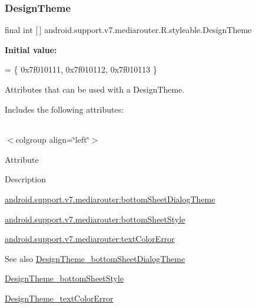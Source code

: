 \subsubsection{\texorpdfstring{Design\+Theme}{DesignTheme}}
{\footnotesize\ttfamily final int \mbox{[}$\,$\mbox{]} android.\+support.\+v7.\+mediarouter.\+R.\+styleable.\+Design\+Theme\hspace{0.3cm}{\ttfamily [static]}}

{\bfseries Initial value\+:}
\begin{DoxyCode}
= \{
            0x7f010111, 0x7f010112, 0x7f010113
        \}
\end{DoxyCode}
Attributes that can be used with a Design\+Theme. 

Includes the following attributes\+:

\tabulinesep=1mm
\begin{longtabu} spread 0pt [c]{*{0}{|X[-1]}|}
\hline
\end{longtabu}
$<$colgroup align=\char`\"{}left\char`\"{}$>$ 

Attribute

Description 

{\ttfamily \hyperlink{classandroid_1_1support_1_1v7_1_1mediarouter_1_1R_1_1styleable_a5217864258d601be9dafb9685000c417}{android.\+support.\+v7.\+mediarouter\+:bottom\+Sheet\+Dialog\+Theme}}

{\ttfamily \hyperlink{classandroid_1_1support_1_1v7_1_1mediarouter_1_1R_1_1styleable_a6056eb777548f236d844db615fe3ad4a}{android.\+support.\+v7.\+mediarouter\+:bottom\+Sheet\+Style}}

{\ttfamily \hyperlink{classandroid_1_1support_1_1v7_1_1mediarouter_1_1R_1_1styleable_a95d15a3901e4631d2c63fa74fc1884e5}{android.\+support.\+v7.\+mediarouter\+:text\+Color\+Error}}

\begin{DoxySeeAlso}{See also}
\hyperlink{classandroid_1_1support_1_1v7_1_1mediarouter_1_1R_1_1styleable_a5217864258d601be9dafb9685000c417}{Design\+Theme\+\_\+bottom\+Sheet\+Dialog\+Theme} 

\hyperlink{classandroid_1_1support_1_1v7_1_1mediarouter_1_1R_1_1styleable_a6056eb777548f236d844db615fe3ad4a}{Design\+Theme\+\_\+bottom\+Sheet\+Style} 

\hyperlink{classandroid_1_1support_1_1v7_1_1mediarouter_1_1R_1_1styleable_a95d15a3901e4631d2c63fa74fc1884e5}{Design\+Theme\+\_\+text\+Color\+Error} 
\end{DoxySeeAlso}
\mbox{\label{classandroid_1_1support_1_1v7_1_1mediarouter_1_1R_1_1styleable_a5217864258d601be9dafb9685000c417}} 
